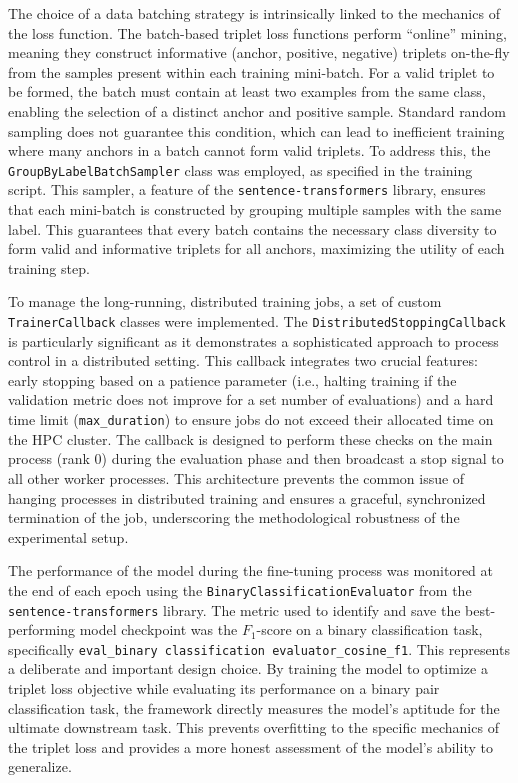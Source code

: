 The choice of a data batching strategy is intrinsically linked to the mechanics of the loss function. The batch-based triplet loss functions perform ``online'' mining, meaning they construct informative (anchor, positive, negative) triplets on-the-fly from the samples present within each training mini-batch. For a valid triplet to be formed, the batch must contain at least two examples from the same class, enabling the selection of a distinct anchor and positive sample. Standard random sampling does not guarantee this condition, which can lead to inefficient training where many anchors in a batch cannot form valid triplets. To address this, the \verb|GroupByLabelBatchSampler| class was employed, as specified in the training script. This sampler, a feature of the \verb|sentence-transformers| library, ensures that each mini-batch is constructed by grouping multiple samples with the same label. This guarantees that every batch contains the necessary class diversity to form valid and informative triplets for all anchors, maximizing the utility of each training step.

To manage the long-running, distributed training jobs, a set of custom \verb|TrainerCallback| classes were implemented. The \verb|DistributedStoppingCallback| is particularly significant as it demonstrates a sophisticated approach to process control in a distributed setting. This callback integrates two crucial features: early stopping based on a patience parameter (i.e., halting training if the validation metric does not improve for a set number of evaluations) and a hard time limit (\verb|max_duration|) to ensure jobs do not exceed their allocated time on the HPC cluster. The callback is designed to perform these checks on the main process (rank 0) during the evaluation phase and then broadcast a stop signal to all other worker processes. This architecture prevents the common issue of hanging processes in distributed training and ensures a graceful, synchronized termination of the job, underscoring the methodological robustness of the experimental setup.

The performance of the model during the fine-tuning process was monitored at the end of each epoch using the \verb|BinaryClassificationEvaluator| from the \verb|sentence-transformers| library. The metric used to identify and save the best-performing model checkpoint was the \(F_1\)-score on a binary classification task, specifically \verb|eval_binary classification evaluator_cosine_f1|. This represents a deliberate and important design choice. By training the model to optimize a triplet loss objective while evaluating its performance on a binary pair classification task, the framework directly measures the model's aptitude for the ultimate downstream task. This prevents overfitting to the specific mechanics of the triplet loss and provides a more honest assessment of the model's ability to generalize.{\setlength{\emergencystretch}{5em}\par}


